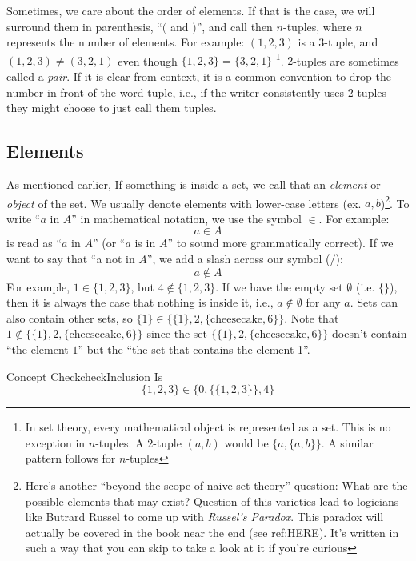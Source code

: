 \documentclass{book}
\begin{document}
Sometimes, we care about the order of elements. If that is the case, we will surround them in parenthesis, ``$($ and
$)$'', and call then $n$-tuples, where $n$ represents the number of elements. For example: $(1,2,3)$ is a $3$-tuple, and
$(1,2,3) \ne (3,2,1)$ even though $\{1,2,3 \} = \{3,2,1\}$ \footnote{In set theory, every mathematical object is
represented as a set. This is no exception in $n$-tuples. A $2$-tuple $(a,b)$ would be $\{a, \{a,b\}\}$. A similar
pattern follows for $n$-tuples}.  $2$-tuples are sometimes called a \emph{pair}. If it is clear from context, it is
a common convention to drop the number in front of the word tuple, i.e., if the writer consistently uses $2$-tuples they
might choose to just call them tuples.


\subsection*{Elements}

As mentioned earlier, If something is inside a set,
we call that an \emph{element} or \emph{object} of the set. We usually denote elements with lower-case letters (ex.
$a,b$)\footnote{Here's another ``beyond the scope of naive set theory'' question: What are the possible elements that
may exist? Question of this varieties lead to logicians like Butrard Russel to come up with \emph{Russel’s Paradox}. This
paradox will actually be covered in the book near the end (see ref:HERE). It's written in such a way that you can skip
to take a look at it if you're curious}. To write ``$a$ in $A$'' in mathematical notation, we use the symbol $\in$.
For example:
\[
	a \in A
\]
is read as ``$a$ in $A$'' (or ``$a$ is in $A$'' to sound more grammatically correct). If we want to say that ``a not in $A$'', we add a slash across our symbol ($/$):
\[
	a \notin A
\]
For example, $1 \in \{1,2,3\}$, but $4\notin \{1,2,3\}$. If we have the empty set $\emptyset$ (i.e. $\{\}$), then it is
always the case that nothing is inside it, i.e., $a\notin \emptyset$ for any $a$. Sets can also contain other sets, so
$\{1\} \in \{\{1\}, 2, \{\text{cheesecake},6\}\}$. Note that $1 \notin \{\{1\}, 2, \{\text{cheesecake},6\}\}$ since the set $\{\{1\}, 2, \{\text{cheesecake},6\}\}$
doesn't contain ``the element $1$'' but the ``the set that contains the element 1''.

\begin{titledBox}{Concept Check}{checkInclusion}
	Is
	\[
		\{1,2,3\} \in \{0, \{\{1,2,3\}\}, 4\}
	\]
\end{titledBox}
\end{document}
